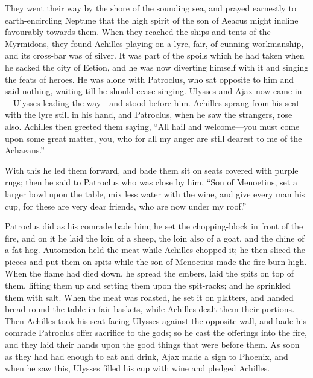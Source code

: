 They went their way by the shore of the sounding sea, and prayed earnestly
to earth-encircling Neptune that the high spirit of the son of Aeacus
might incline favourably towards them. When they reached the ships and
tents of the Myrmidons, they found Achilles playing on a lyre, fair, of
cunning workmanship, and its cross-bar was of silver. It was part of the
spoils which he had taken when he sacked the city of Eetion, and he was
now diverting himself with it and singing the feats of heroes. He was
alone with Patroclus, who sat opposite to him and said nothing, waiting
till he should cease singing. Ulysses and Ajax now came in—Ulysses
leading the way—and stood before him. Achilles sprang from his seat
with the lyre still in his hand, and Patroclus, when he saw the strangers,
rose also. Achilles then greeted them saying, “All hail and welcome—you
must come upon some great matter, you, who for all my anger are still
dearest to me of the Achaeans.”

With this he led them forward, and bade them sit on seats covered with
purple rugs; then he said to Patroclus who was close by him, “Son of
Menoetius, set a larger bowl upon the table, mix less water with the wine,
and give every man his cup, for these are very dear friends, who are now
under my roof.”

Patroclus did as his comrade bade him; he set the chopping-block in front
of the fire, and on it he laid the loin of a sheep, the loin also of a
goat, and the chine of a fat hog. Automedon held the meat while Achilles
chopped it; he then sliced the pieces and put them on spits while the son
of Menoetius made the fire burn high. When the flame had died down, he
spread the embers, laid the spits on top of them, lifting them up and
setting them upon the spit-racks; and he sprinkled them with salt. When
the meat was roasted, he set it on platters, and handed bread round the
table in fair baskets, while Achilles dealt them their portions. Then
Achilles took his seat facing Ulysses against the opposite wall, and bade
his comrade Patroclus offer sacrifice to the gods; so he cast the
offerings into the fire, and they laid their hands upon the good things
that were before them. As soon as they had had enough to eat and drink,
Ajax made a sign to Phoenix, and when he saw this, Ulysses filled his cup
with wine and pledged Achilles.

